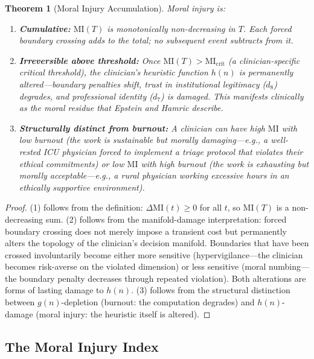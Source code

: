 \documentclass[12pt]{article}
\newtheorem{theorem}{Theorem}[section]
\theoremstyle{definition}
\theoremstyle{remark}
\newcommand{\MI}{\mathrm{MI}}              %
\begin{document}
\begin{theorem}[Moral Injury Accumulation]
\label{thm:mi_accumulation}
Moral injury is:
\begin{enumerate}
    \item \textbf{Cumulative:} $\MI(T)$ is monotonically non-decreasing in $T$.  Each forced boundary crossing adds to the total; no subsequent event subtracts from it.
    \item \textbf{Irreversible above threshold:} Once $\MI(T) > \MI_{\text{crit}}$ (a clinician-specific critical threshold), the clinician's heuristic function $h(n)$ is permanently altered---boundary penalties shift, trust in institutional legitimacy ($d_8$) degrades, and professional identity ($d_7$) is damaged.  This manifests clinically as the moral residue that Epstein and Hamric \cite{epstein2009} describe.
    \item \textbf{Structurally distinct from burnout:} A clinician can have high $\MI$ with low burnout (the work is sustainable but morally damaging---e.g., a well-rested ICU physician forced to implement a triage protocol that violates their ethical commitments) or low $\MI$ with high burnout (the work is exhausting but morally acceptable---e.g., a rural physician working excessive hours in an ethically supportive environment).
\end{enumerate}
\end{theorem}

\begin{proof}
(1) follows from the definition: $\Delta \MI(t) \geq 0$ for all $t$, so $\MI(T)$ is a non-decreasing sum.  (2) follows from the manifold-damage interpretation: forced boundary crossing does not merely impose a transient cost but permanently alters the topology of the clinician's decision manifold.  Boundaries that have been crossed involuntarily become either more sensitive (hypervigilance---the clinician becomes risk-averse on the violated dimension) or less sensitive (moral numbing---the boundary penalty decreases through repeated violation).  Both alterations are forms of lasting damage to $h(n)$.  (3) follows from the structural distinction between $g(n)$-depletion (burnout: the computation degrades) and $h(n)$-damage (moral injury: the heuristic itself is altered).
\end{proof}

\subsection{The Moral Injury Index}
\end{document}

